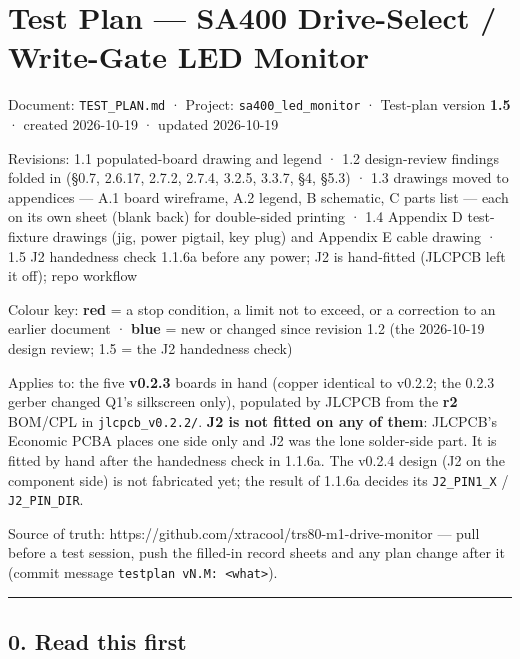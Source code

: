 \documentclass[
  10pt,
  twoside]{article}
\author{}
\date{}
\begin{document}
\hypertarget{test-plan-sa400-drive-select-write-gate-led-monitor}{%
\section{Test Plan --- SA400 Drive-Select / Write-Gate LED
Monitor}\label{test-plan-sa400-drive-select-write-gate-led-monitor}}

Document: \texttt{TEST\_PLAN.md} · Project:
\texttt{sa400\_led\_monitor} · Test-plan version
\textbf{1.5} · created 2026-10-19 · updated 2026-10-19

Revisions: 1.1 populated-board drawing and legend · 1.2
design-review findings folded in (§0.7, 2.6.17, 2.7.2,
2.7.4, 3.2.5, 3.3.7, §4, §5.3) · 1.3 drawings moved to
appendices --- A.1 board wireframe, A.2 legend, B schematic,
C parts list --- each on its own sheet (blank back) for
double-sided printing · 1.4 Appendix D test-fixture drawings
(jig, power pigtail, key plug) and Appendix E cable drawing
· 1.5 J2 handedness check 1.1.6a before any power; J2 is
hand-fitted (JLCPCB left it off); repo workflow

Colour key: \textcolor[HTML]{B00000}{\textbf{red} = a stop
condition, a limit not to exceed, or a correction to an
earlier document} · \textcolor[HTML]{0040A0}{\textbf{blue} =
new or changed since revision 1.2 (the 2026-10-19 design
review; 1.5 = the J2 handedness check)}

Applies to: the five \textbf{v0.2.3} boards in hand (copper
identical to v0.2.2; the 0.2.3 gerber changed Q1's
silkscreen only), populated by JLCPCB from the \textbf{r2}
BOM/CPL in \texttt{jlcpcb\_v0.2.2/}.
\textcolor[HTML]{0040A0}{\textbf{J2 is not fitted on any of
them}: JLCPCB's Economic PCBA places one side only and J2
was the lone solder-side part. It is fitted by hand after
the handedness check in 1.1.6a. The v0.2.4 design (J2 on the
component side) is not fabricated yet; the result of 1.1.6a
decides its \texttt{J2\_PIN1\_X} / \texttt{J2\_PIN\_DIR}.}

Source of truth:
https://github.com/xtracool/trs80-m1-drive-monitor --- pull
before a test session, push the filled-in record sheets and
any plan change after it (commit message
\texttt{testplan\ vN.M:\ \textless{}what\textgreater{}}).

\begin{center}\rule{0.5\linewidth}{0.5pt}\end{center}

\hypertarget{read-this-first}{%
\subsection{0. Read this first}\label{read-this-first}}
\end{document}

